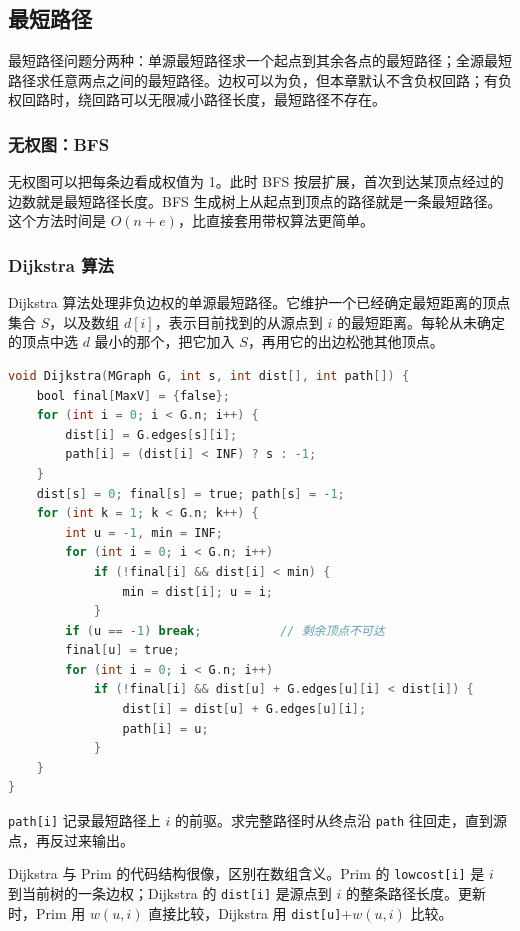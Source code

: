 \subsection{最短路径}

最短路径问题分两种：单源最短路径求一个起点到其余各点的最短路径；全源最短路径求任意两点之间的最短路径。边权可以为负，但本章默认不含负权回路；有负权回路时，绕回路可以无限减小路径长度，最短路径不存在。

\subsubsection{无权图：BFS}

无权图可以把每条边看成权值为 1。此时 BFS 按层扩展，首次到达某顶点经过的边数就是最短路径长度。BFS 生成树上从起点到顶点的路径就是一条最短路径。这个方法时间是 $O(n+e)$，比直接套用带权算法更简单。

\subsubsection{Dijkstra 算法}

Dijkstra 算法处理非负边权的单源最短路径。它维护一个已经确定最短距离的顶点集合 $S$，以及数组 $d[i]$，表示目前找到的从源点到 $i$ 的最短距离。每轮从未确定的顶点中选 $d$ 最小的那个，把它加入 $S$，再用它的出边松弛其他顶点。

\begin{lstlisting}[language=C]
void Dijkstra(MGraph G, int s, int dist[], int path[]) {
    bool final[MaxV] = {false};
    for (int i = 0; i < G.n; i++) {
        dist[i] = G.edges[s][i];
        path[i] = (dist[i] < INF) ? s : -1;
    }
    dist[s] = 0; final[s] = true; path[s] = -1;
    for (int k = 1; k < G.n; k++) {
        int u = -1, min = INF;
        for (int i = 0; i < G.n; i++)
            if (!final[i] && dist[i] < min) {
                min = dist[i]; u = i;
            }
        if (u == -1) break;           // 剩余顶点不可达
        final[u] = true;
        for (int i = 0; i < G.n; i++)
            if (!final[i] && dist[u] + G.edges[u][i] < dist[i]) {
                dist[i] = dist[u] + G.edges[u][i];
                path[i] = u;
            }
    }
}
\end{lstlisting}

\texttt{path[i]} 记录最短路径上 $i$ 的前驱。求完整路径时从终点沿 \texttt{path} 往回走，直到源点，再反过来输出。

Dijkstra 与 Prim 的代码结构很像，区别在数组含义。Prim 的 \texttt{lowcost[i]} 是 $i$ 到当前树的一条边权；Dijkstra 的 \texttt{dist[i]} 是源点到 $i$ 的整条路径长度。更新时，Prim 用 $w(u,i)$ 直接比较，Dijkstra 用 \texttt{dist[u]}+$w(u,i)$ 比较。

